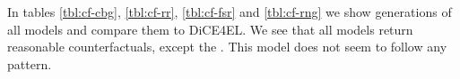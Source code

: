 \documentclass[./../../paper.tex]{subfiles}
\begin{document}
In tables \ref{tbl:cf-cbg}, \ref{tbl:cf-rr}, \ref{tbl:cf-fsr} and \ref{tbl:cf-rng} we show generations of all models and compare them to DiCE4EL. We see that all models return reasonable counterfactuals, except the \ModelRNG. This model does not seem to follow any pattern.  


\end{document}
